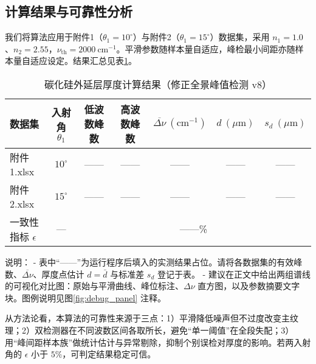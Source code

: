 \documentclass{ctexart} %
\begin{document}
\subsection{计算结果与可靠性分析}
我们将算法应用于附件1（\(\theta_1=10^\circ\)）与附件2（\(\theta_1=15^\circ\)）数据集，采用 \(n_1=1.0\)、\(n_2=2.55\)，\(\nu_{\mathrm{th}}=2000~\mathrm{cm}^{-1}\)。平滑参数随样本量自适应，峰检最小间距亦随样本量自适应设定。结果汇总见表\ref{tab:res_sic}。

\begin{table}[h]
    \centering
    \caption{碳化硅外延层厚度计算结果（修正全景峰值检测 v8）}
    \label{tab:res_sic}
    \begin{tabular}{lcccccc}
        \toprule
        数据集              & 入射角 $\theta_1$ & 低波数峰数                    & 高波数峰数 & $\overline{\Delta \nu}\ (\mathrm{cm}^{-1})$ & $d\ (\mu\mathrm{m})$ & $s_d\ (\mu\mathrm{m})$ \\
        \midrule
        附件1.xlsx         & $10^\circ$     & ——                       & ——    & ——                                          & ——                   & ——                     \\
        附件2.xlsx         & $15^\circ$     & ——                       & ——    & ——                                          & ——                   & ——                     \\
        \midrule
        一致性指标 $\epsilon$ & —              & \multicolumn{5}{c}{——\%}                                                                                                       \\
        \bottomrule
    \end{tabular}
\end{table}

说明：
- 表中“——”为运行程序后填入的实测结果占位。请将各数据集的有效峰数、\(\overline{\Delta\nu}\)、厚度点估计 \(d=\bar d\) 与标准差 \(s_d\) 登记于表。
- 建议在正文中给出两组谱线的可视化对比图：原始与平滑曲线、峰位标注、\(\Delta\nu\) 直方图，以及参数摘要文字块。图例说明见图\ref{fig:debug_panel} 注释。

从方法论看，本算法的可靠性来源于三点：1）平滑降低噪声但不过度改变主纹理；2）双检测器在不同波数区间各取所长，避免“单一阈值”在全段失配；3）用“峰间距样本族”做统计估计与异常剔除，抑制个别误检对厚度的影响。若两入射角的 \(\epsilon\) 小于 \(5\%\)，可判定结果稳定可信。
\end{document}
